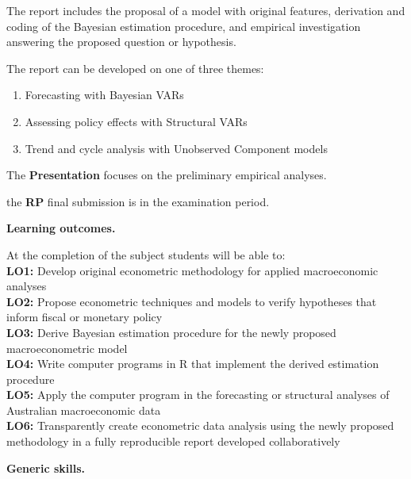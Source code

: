 \documentclass[10pt]{article}
\begin{document}
\begin{multicols}{2}
\smallskip\noindent The report includes the proposal of a model with original features, derivation and coding of the Bayesian estimation procedure, and empirical investigation answering the proposed question or hypothesis.

\smallskip\noindent The report can be developed on one of three themes:
\begin{enumerate}
\item Forecasting with Bayesian VARs
\item Assessing policy effects with Structural VARs
\item Trend and cycle analysis with Unobserved Component models
\end{enumerate}

\smallskip\noindent The \textbf{Presentation} focuses on the preliminary empirical analyses.

\smallskip\noindent the \textbf{RP} final submission is in the examination period.

\vfill\null
\columnbreak

\noindent\textbf{Learning outcomes.}

\noindent\smallskip At the completion of the subject students will be able to:\\[1ex]
\textbf{LO1:} Develop original econometric methodology for applied macroeconomic analyses\\[1ex]
\textbf{LO2:} Propose econometric techniques and models to verify hypotheses that inform fiscal or monetary policy\\[1ex]
\textbf{LO3:} Derive Bayesian estimation procedure for the newly proposed macroeconometric model\\[1ex]
\textbf{LO4:} Write computer programs in R that implement the derived estimation procedure\\[1ex]
\textbf{LO5:} Apply the computer program in the forecasting or structural analyses of Australian macroeconomic data\\[1ex]
\textbf{LO6:} Transparently create econometric data analysis using the newly proposed methodology in a fully reproducible report developed collaboratively


\bigskip\noindent\textbf{Generic skills.}


\end{multicols}
\end{document}
